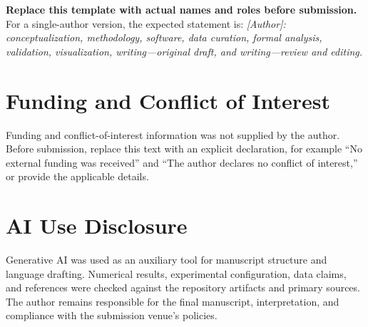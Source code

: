 \documentclass[11pt,a4paper]{article}
\begin{document}
\textbf{Replace this template with actual names and roles before submission.} For a single-author version, the expected statement is: \textit{[Author]: conceptualization, methodology, software, data curation, formal analysis, validation, visualization, writing---original draft, and writing---review and editing.}

\section*{Funding and Conflict of Interest}

Funding and conflict-of-interest information was not supplied by the author. Before submission, replace this text with an explicit declaration, for example ``No external funding was received'' and ``The author declares no conflict of interest,'' or provide the applicable details.

\section*{AI Use Disclosure}

Generative AI was used as an auxiliary tool for manuscript structure and language drafting. Numerical results, experimental configuration, data claims, and references were checked against the repository artifacts and primary sources. The author remains responsible for the final manuscript, interpretation, and compliance with the submission venue's policies.



\end{document}

